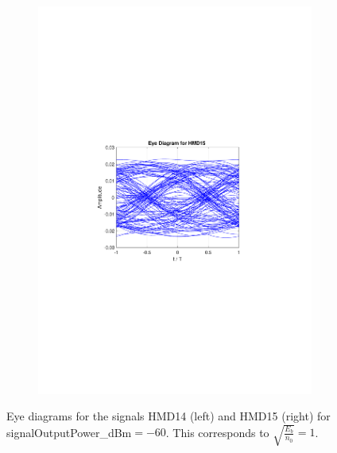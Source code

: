 \begin{figure}
\begin{subfigure}{.5\textwidth}
		\includegraphics[clip, trim=5cm 10cm 5cm 10cm, width=\textwidth]{./sdf/m_qam_system/figures/HMD15_eye_diagram_60.pdf}
	\end{subfigure}
	\caption{Eye diagrams for the signals HMD14 (left) and HMD15 (right) for signalOutputPower\_dBm$=-60$. This corresponds to $\sqrt{\frac{E_b}{n_0}}=1$.}
	\label{fig:eye_diagram_60}
\end{figure}

